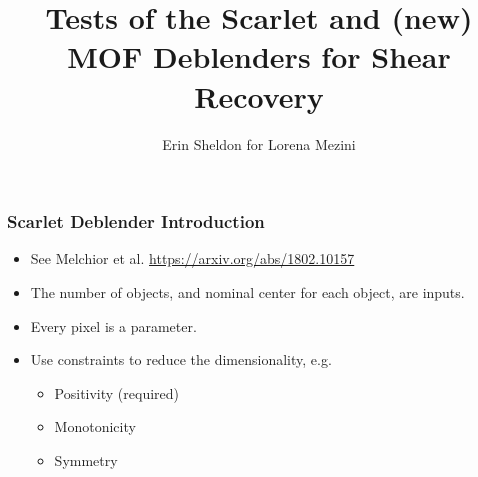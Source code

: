 \documentclass{beamer}
\title{Tests of the Scarlet and (new) MOF Deblenders for Shear Recovery}
\author{Erin Sheldon for Lorena Mezini}
\institute{Brookhaven National Laboratory, Stony Brook University}
\begin{document}
\frame{\titlepage}



\frame
{
    \frametitle{Scarlet Deblender Introduction}

    \begin{itemize}

        \item See Melchior et al. \url{https://arxiv.org/abs/1802.10157 }

        \item The number of objects, and nominal center for each object, are inputs.

        \item Every pixel is a parameter.


        \item Use constraints to reduce the dimensionality, e.g.
        \begin{itemize}
            \item Positivity (required)
            \item Monotonicity
            \item Symmetry
        \end{itemize}

    \end{itemize}

}
\end{document}
